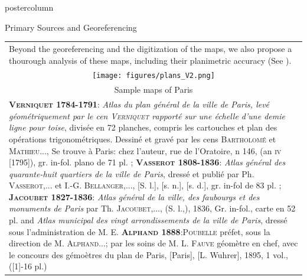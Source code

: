 \documentclass[final,hyperref={pdfpagelabels=false}]{beamer}
\let\oldcite=\cite
\renewcommand{\cite}[1]{\textcolor{ta3chameleon}{\oldcite{#1}}}
\begin{document}
\begin{frame}
\begin{columns}
\begin{column}{0.5\textwidth}
\begin{beamercolorbox}[center,wd=\textwidth]{postercolumn}
\begin{minipage}[t]{.98\textwidth}
\begin{block}{Primary Sources and Georeferencing}
\begin{tabular}{p{}p{}}
        \multicolumn{2}{p{0.9\textwidth}}{Beyond the georeferencing and the digitization of the maps, we also propose a thourough analysis of these maps, including their planimetric accuracy (See \cite{Dumenieu2013a,Dumenieu2015PhD,Dumenieu2018}).}\\
        \multicolumn{2}{c}{\texttt{[image: figures/plans\_V2.png]}}\\
	\multicolumn{2}{c}{\scriptsize Sample maps of Paris}\\%
        \multicolumn{2}{p{0.9\textwidth}}{
          \tiny{
            \textsc{\textbf{Verniquet 1784-1791}:}
            \textit{Atlas du plan général de la ville de Paris, levé géométriquement par le cen \textsc{Verniquet} rapporté sur une échelle d'une demie ligne pour toise}, divisée en 72 planches, compris les cartouches et plan des opérations trigonométriques.
            Dessiné et gravé par les cens \textsc{Bartholomé} et \textsc{Mathieu}...,
            Se trouve à Paris: chez l'auteur, rue de l'Oratoire, n 146, (an \textsc{iv} [1795]), gr. in-fol. plano de 71 pl. ;
            \textsc{\textbf{Vasserot 1808-1836}:}
            \textit{Atlas général des quarante-huit quartiers de la ville de Paris}, dressé et publié par Ph. \textsc{Vasserot},... et I.-G. \textsc{Bellanger},..., [S. l.], [s. n.], [s. d.], gr. in-fol de 83 pl. ;
            \textsc{\textbf{Jacoubet 1827-1836}:}
            \textit{Atlas général de la ville, des faubourgs et des monuments de Paris} par Th. \textsc{Jacoubet},..., (S. l.,), 1836, Gr. in-fol., carte en 52 pl. and \textit{Atlas municipal des vingt arrondissements de la ville de Paris}, dressé sous l'administration de M. E.
            \textsc{\textbf{Alphand 1888}:}\textsc{Poubelle} préfet, sous la direction de M. \textsc{Alphand}...; par les soins de M. L. \textsc{Fauve} géomètre en chef, avec le concours des gémoètres du plan de Paris, [Paris], [L. Wuhrer], 1895, 1 vol., ([1]-16 pl.)
          }
        }\\
	

\end{tabular}
\end{block}
\end{minipage}
\end{beamercolorbox}
\end{column}
\end{columns}
\end{frame}
\end{document}

